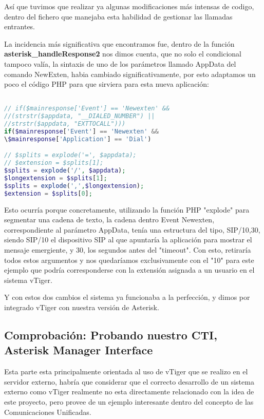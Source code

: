 Así que tuvimos que realizar ya algunas modificaciones más intensas de codigo, dentro del fichero que manejaba esta habilidad de gestionar las llamadas entrantes.

La incidencia más significativa que encontramos fue, dentro de la función \textbf{asterisk\_handleResponse2} nos dimos cuenta, que no solo el condicional tampoco valía, la sintaxis de uno de los parámetros llamado AppData del comando NewExten, habia cambiado significativamente, por esto adaptamos un poco el código PHP para que sirviera para esta nueva aplicación:

\begin{lstlisting}[language=php,title={./www/vtigercrm/cron/modules/PBXManager/AsteriskClient.php}]

// if($mainresponse['Event'] == 'Newexten' && 
//(strstr($appdata, "__DIALED_NUMBER") || 
//strstr($appdata, "EXTTOCALL")))
if($mainresponse['Event'] == 'Newexten' && 
\$mainresponse['Application'] == 'Dial')

// $splits = explode('=', $appdata);
// $extension = $splits[1];
$splits = explode('/', $appdata); 
$longextension = $splits[1];
$splits = explode(',',$longextension);
$extension = $splits[0];

\end{lstlisting}

Esto ocurría porque concretamente, utilizando la función PHP "explode" para segmentar una cadena de texto, la cadena dentro Event Newexten, correspondiente al parámetro AppData, tenía una estructura del tipo, SIP/10,30, siendo SIP/10 el dispositivo SIP al que apuntaría la aplicación para mostrar el mensaje emergiente, y 30, los segundos antes del "timeout". Con esto, retiraría todos estos argumentos y nos quedaríamos exclusivamente con el "10" para este ejemplo que podría corresponderse con la extensión asignada a un usuario en el sistema vTiger.

Y con estos dos cambios el sistema ya funcionaba a la perfección, y dimos por integrado vTiger con nuestra versión de Asterisk.

\subsection{Comprobación: Probando nuestro CTI, Asterisk Manager Interface}

Esta parte esta principalmente orientada al uso de vTiger que se realizo en el servidor externo, habría que considerar que el correcto desarrollo de un sistema externo como vTiger realmente no esta directamente relacionado con la idea de este proyecto, pero provee de un ejemplo interesante dentro del concepto de las Comunicaciones Unificadas. 

